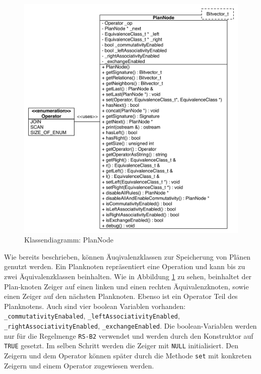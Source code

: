 \begin{figure}[ht]
  \centering
  \includegraphics[width=\textwidth]{04_Implementierung/00_media/PlanNodeClass.pdf}
  \caption{Klassendiagramm: PlanNode}
  \label{PlanNodeClass}
\end{figure}

Wie bereits beschrieben, können Äuqivalenzklassen zur Speicherung von Plänen genutzt werden. Ein Planknoten repräsentiert eine Operation und kann bis zu zwei Äquivalenzklassen beinhalten. Wie in Abbildung \ref{PlanNodeClass} zu sehen, beinhaltet der Plan-knoten Zeiger auf einen linken und einen rechten Äquivalenzknoten, sowie einen Zeiger auf den nächsten Planknoten. Ebenso ist ein Operator Teil des Planknotens. Auch sind vier boolean Variablen vorhanden: \texttt{\_commutativity\-Enabaled}, \texttt{\_left\-Associativity\-Enabled},  \texttt{\_right\-Associativity\-Enabled},  \texttt{\_exchange\-Enabled}. Die boo\-lean-Variablen werden nur für die Regelmenge \texttt{RS-B2} verwendet und werden durch den Konstruktor auf \texttt{TRUE} gesetzt. Im selben Schritt werden die Zeiger mit \texttt{NULL} initialisiert. Den Zeigern und dem Operator können später durch die Methode \texttt{set} mit konkreten Zeigern und einem Operator zugewiesen werden.

